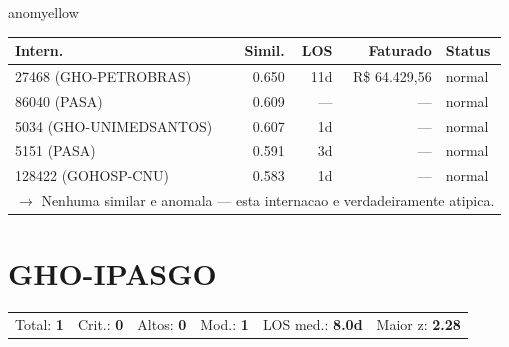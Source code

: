 \documentclass[a4paper,10pt]{article}
\begin{document}
\begin{anomalycard}[Internacao 322 | GHO-ICS | MODERADO (z=2.14)]{anomyellow}
\begin{tabular}{l r r r l}\toprule\textbf{Intern.} & \textbf{Simil.} & \textbf{LOS} & \textbf{Faturado} & \textbf{Status} \\\midrule
27468 (GHO-PETROBRAS) & 0.650 & 11d & R\$ 64.429,56 & \textcolor{jcubeblue}{normal} \\
86040 (PASA) & 0.609 & --- & --- & \textcolor{jcubeblue}{normal} \\
5034 (GHO-UNIMEDSANTOS) & 0.607 & 1d & --- & \textcolor{jcubeblue}{normal} \\
5151 (PASA) & 0.591 & 3d & --- & \textcolor{jcubeblue}{normal} \\
128422 (GOHOSP-CNU) & 0.583 & 1d & --- & \textcolor{jcubeblue}{normal} \\
\multicolumn{5}{l}{\textcolor{jcubeblue}{\small $\rightarrow$ Nenhuma similar e anomala --- esta internacao e verdadeiramente atipica.}} \\
\bottomrule\end{tabular}


\end{anomalycard}

\newpage

\clearpage
\section{GHO-IPASGO}
\begin{tcolorbox}[colback=lightblue,colframe=jcubeblue,title={\textbf{Resumo --- GHO-IPASGO}}]
\begin{tabular}{ll@{\quad}ll@{\quad}ll}
Total: \textbf{1} &
Crit.: \textcolor{anomred}{\textbf{0}} &
Altos: \textcolor{anomorange}{\textbf{0}} &
Mod.: \textcolor{anomyellow}{\textbf{1}} &
LOS med.: \textbf{8.0d} &
Maior z: \textbf{2.28} \\


\end{tabular}
\end{tcolorbox}
\end{document}
